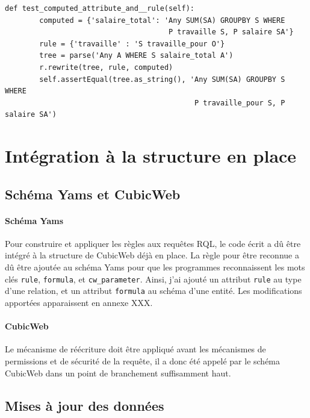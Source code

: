 \documentclass {report}
\begin{document}
\begin{lstlisting}[caption= Attribut calculé et réécriture de relation]
    def test_computed_attribute_and__rule(self):
        computed = {'salaire_total': 'Any SUM(SA) GROUPBY S WHERE
                                      P travaille S, P salaire SA'}
        rule = {'travaille' : 'S travaille_pour O'}
        tree = parse('Any A WHERE S salaire_total A')
        r.rewrite(tree, rule, computed)
        self.assertEqual(tree.as_string(), 'Any SUM(SA) GROUPBY S WHERE
                                            P travaille_pour S, P salaire SA')
\end{lstlisting}

\section{Intégration à la structure en place}

\subsection{Schéma Yams et CubicWeb}
\paragraph{Schéma Yams}
Pour construire et appliquer les règles aux requêtes RQL, le code écrit a dû être intégré à la structure de CubicWeb déjà en place. La règle pour être reconnue a dû être ajoutée au schéma Yams pour que les programmes reconnaissent les mots clés \verb+rule+, \verb+formula+, et \verb+cw_parameter+. Ainsi, j'ai ajouté un attribut \verb+rule+ au type d'une relation, et un attribut \verb+formula+ au schéma d'une entité. Les modifications apportées apparaissent en annexe XXX.

\paragraph{CubicWeb}
Le mécanisme de réécriture doit être appliqué avant les mécanismes de permissions et de sécurité de la requête, il a donc été appelé par le schéma CubicWeb dans un point de branchement suffisamment haut.

\subsection{Mises à jour des données}
\end{document}

